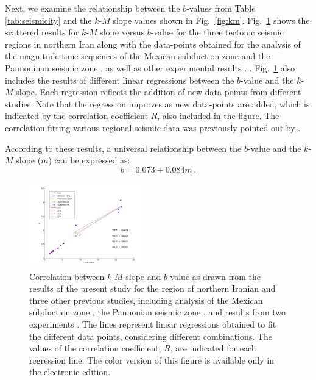 Next, we examine the relationship between the $b$-values from Table \ref{tab:seismicity} and the $k$-$M$ slope values shown in Fig.~\ref{fig:km}.  Fig.~\ref{fig:regression} shows the scattered results for $k$-$M$ slope versus $b$-value for the three tectonic seismic regions in northern Iran along with the data-points obtained for the analysis of the magnitude-time sequences of the Mexican subduction zone \citep{Telesca2013} and the Pannoninan seismic zone \citep{Telesca2014}, as well as other experimental results \citep{Telesca2014-pone}. . Fig.~\ref{fig:regression} also includes the results of different linear regressions between the $b$-value and the $k$-$M$ slope. Each regression reflects the addition of new data-points from different studies. Note that the regression improves as new data-points are added, which is indicated by the correlation coefficient $R$, also included in the figure. The correlation fitting various regional seismic data was previously pointed out by \citet{Telesca2014}.

According to these results, a universal relationship between the $b$-value and the $k$-$M$ slope ($m$) can be expressed as:
% 
\begin{equation}
	b = 0.073 + 0.084 m \, .
	\label{eq:universal.bm}
\end{equation}

\begin{figure}[h]%
	\centering
	\includegraphics[width=0.45\textwidth]{figures/pdf/figure-07-rev.pdf} 
	\caption{Correlation between $k$-$M$ slope and $b$-value as drawn from the results of the present study for the region of northern Iranian and three other previous studies, including analysis of the Mexican subduction zone \citep{Telesca2013}, the Pannonian seismic zone \citep{Telesca2014}, and results from two experiments \citep{Telesca2014-pone}. The lines represent linear regressions obtained to fit the different data points, considering different combinations. The values of the correlation coefficient, $R$, are indicated for each regression line. The color version of this figure is available only in the electronic edition.}
	\label{fig:regression}
\end{figure}

